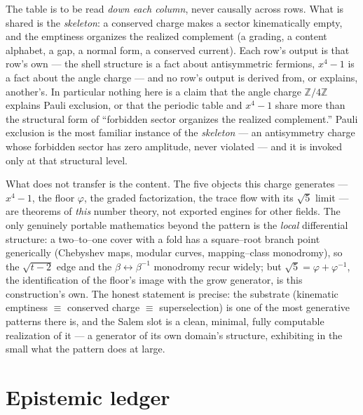 \documentclass[11pt]{article}
\theoremstyle{plain}
\theoremstyle{definition}
\theoremstyle{remark}
\newcommand{\Z}{\mathbb{Z}}
\begin{document}
The table is to be read \emph{down each column}, never causally across rows. What is shared is the \emph{skeleton}: a conserved charge makes a sector kinematically empty, and the emptiness organizes the realized complement (a grading, a content alphabet, a gap, a normal form, a conserved current). Each row's output is that row's own --- the shell structure is a fact about antisymmetric fermions, $x^4-1$ is a fact about the angle charge --- and no row's output is derived from, or explains, another's. In particular nothing here is a claim that the angle charge $\Z/4\Z$ explains Pauli exclusion, or that the periodic table and $x^4-1$ share more than the structural form of ``forbidden sector organizes the realized complement.'' Pauli exclusion is the most familiar instance of the \emph{skeleton} --- an antisymmetry charge whose forbidden sector has zero amplitude, never violated --- and it is invoked only at that structural level.

What does not transfer is the content. The five objects this charge generates --- $x^4-1$, the floor $\varphi$, the graded factorization, the trace flow with its $\sqrt5$ limit --- are theorems of \emph{this} number theory, not exported engines for other fields. The only genuinely portable mathematics beyond the pattern is the \emph{local} differential structure: a two--to--one cover with a fold has a square--root branch point generically (Chebyshev maps, modular curves, mapping--class monodromy), so the $\sqrt{t-2}$ edge and the $\beta\leftrightarrow\beta^{-1}$ monodromy recur widely; but $\sqrt5=\varphi+\varphi^{-1}$, the identification of the floor's image with the grow generator, is this construction's own. The honest statement is precise: the substrate (kinematic emptiness $\equiv$ conserved charge $\equiv$ superselection) is one of the most generative patterns there is, and the Salem slot is a clean, minimal, fully computable realization of it --- a generator of its own domain's structure, exhibiting in the small what the pattern does at large.

\section{Epistemic ledger}\label{sec:ledger}
\end{document}
